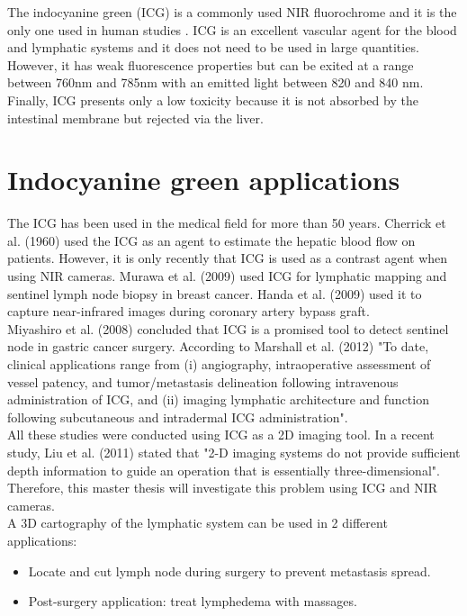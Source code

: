The indocyanine green (ICG) is a commonly used NIR fluorochrome and it is the only one used in human studies \cite{marshall_near-infrared_2010}. ICG is an excellent vascular agent for the blood and lymphatic systems and it does not need to be used in large quantities. However, it has weak fluorescence properties but can be exited at a range between 760nm and 785nm with an emitted light between 820 and 840 nm. \\

Finally, ICG presents only a low toxicity \cite{m_adverse_1994} because it is not absorbed by the intestinal membrane but rejected via the liver.

\section{Indocyanine green applications}
\label{sec: ICG Applications}
The ICG has been used in the medical field for more than 50 years. Cherrick et al. (1960) \cite{cherrick_indocyanine_1960} used the ICG as an agent to estimate the hepatic blood flow on patients.  However, it is only recently that ICG is used as a contrast agent when using NIR cameras. Murawa et al. (2009) \cite{murawa_sentinel_2009} used ICG for lymphatic mapping and sentinel lymph node biopsy in breast cancer. Handa et al. (2009) \cite{handa_preliminary_2009} used it to capture near-infrared images during coronary artery bypass graft. \\

Miyashiro et al. (2008) \cite{miyashiro_detection_2008} concluded that ICG is a promised tool to detect sentinel node in gastric cancer surgery. According to Marshall et al. (2012) \cite{marshall_near-infrared_2010} "To date, clinical applications range from (i) angiography, intraoperative assessment of vessel patency, and tumor/metastasis delineation following intravenous administration of ICG, and (ii) imaging lymphatic architecture and function following subcutaneous and intradermal ICG administration".\\

All these studies were conducted using ICG as a 2D imaging tool. In a recent study, Liu et al. (2011) \cite{liu_hands-free_2011} stated that "2-D imaging systems do not provide sufficient depth information to guide an operation that is essentially three-dimensional". Therefore, this master thesis will investigate this problem using ICG and NIR cameras. \\

A 3D cartography of the lymphatic system can be used in 2 different applications:
\begin{itemize}
  \item Locate and cut lymph node during surgery to prevent metastasis spread.
  \item Post-surgery application: treat lymphedema with massages. 
\end{itemize}

